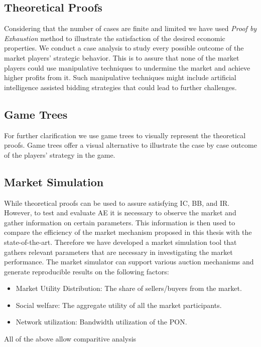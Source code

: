 \subsection{Theoretical Proofs}

Considering that the number of cases are finite and limited we have used \textit{Proof by Exhaustion} method to illustrate the satisfaction of the desired economic properties. We conduct a case analysis to study every possible outcome of the market players' strategic behavior. This is to assure that none of the market players could use manipulative techniques to undermine the market and achieve higher profits from it. Such manipulative techniques might include artificial intelligence assisted bidding strategies that could lead to further challenges. 

\subsection{Game Trees}
For further clarification we use game trees to visually represent the theoretical proofs. Game trees offer a visual alternative to illustrate the case by case outcome of the players' strategy in the game. 
\subsection{Market Simulation}
\label{Method:subsec:simul}
While theoretical proofs can be used to assure satisfying \ac{IC}, \ac{BB}, and \ac{IR}. However, to test and evaluate \acl{AE} it is necessary to observe the market and gather information on certain parameters. This information is then used to compare the efficiency of the market mechanism proposed in this thesis with the state-of-the-art.
Therefore we have developed a market simulation tool that gathers relevant parameters that are necessary in investigating the market performance. The market simulator can support various auction mechanisms and generate reproducible results on the following factors:
\begin{itemize}
    \item Market Utility Distribution: The share of sellers/buyers from the market.
    \item Social welfare: The aggregate utility of all the market participants.
    \item Network utilization: Bandwidth utilization of the \ac{PON}.
\end{itemize}

All of the above 
allow comparitive analysis

